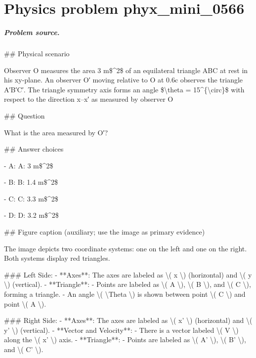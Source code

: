 
\chapter{Physics problem phyx\_mini\_0566}
\label{ch:PhyXMiniProblems_problem_phyx_mini_0566}

\paragraph{Problem source.}
\#\# Physical scenario

Observer O measures the area 3 m\$\textasciicircum{}2\$ of an equilateral triangle ABC at rest in his xy-plane. An observer O′ moving relative to O at 0.6c observes the triangle A′B′C′. The triangle symmetry axis forms an angle \$\textbackslash{}theta = 15\textasciicircum{}\{\textbackslash{}circ\}\$ with respect to the direction x–x′ as measured by observer O

\#\# Question

What is the area measured by O′?

\#\# Answer choices

- A: A: 3 m\$\textasciicircum{}2\$

- B: B: 1.4 m\$\textasciicircum{}2\$

- C: C: 3.3 m\$\textasciicircum{}2\$

- D: D: 3.2 m\$\textasciicircum{}2\$

\#\# Figure caption (auxiliary; use the image as primary evidence)

The image depicts two coordinate systems: one on the left and one on the right. Both systems display red triangles.

\#\#\# Left Side:
- **Axes**: The axes are labeled as \textbackslash{}( x \textbackslash{}) (horizontal) and \textbackslash{}( y \textbackslash{}) (vertical).
- **Triangle**:
  - Points are labeled as \textbackslash{}( A \textbackslash{}), \textbackslash{}( B \textbackslash{}), and \textbackslash{}( C \textbackslash{}), forming a triangle.
  - An angle \textbackslash{}( \textbackslash{}Theta \textbackslash{}) is shown between point \textbackslash{}( C \textbackslash{}) and point \textbackslash{}( A \textbackslash{}).

\#\#\# Right Side:
- **Axes**: The axes are labeled as \textbackslash{}( x' \textbackslash{}) (horizontal) and \textbackslash{}( y' \textbackslash{}) (vertical).
- **Vector and Velocity**:
  - There is a vector labeled \textbackslash{}( V \textbackslash{}) along the \textbackslash{}( x' \textbackslash{}) axis.
- **Triangle**:
  - Points are labeled as \textbackslash{}( A' \textbackslash{}), \textbackslash{}( B' \textbackslash{}), and \textbackslash{}( C' \textbackslash{}).

